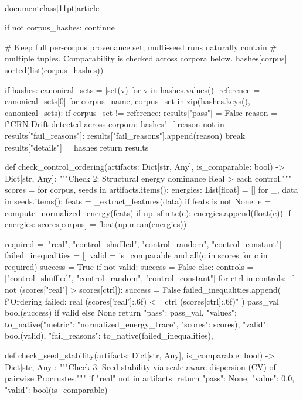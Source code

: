 \\documentclass[11pt]{article}
\begin{document}
\begin{CodeBlock}
        if not corpus_hashes: continue

        # Keep full per-corpus provenance set; multi-seed runs naturally contain
        # multiple tuples. Comparability is checked across corpora below.
        hashes[corpus] = sorted(list(corpus_hashes))
            
    if hashes:
        canonical_sets = [set(v) for v in hashes.values()]
        reference = canonical_sets[0]
        for corpus_name, corpus_set in zip(hashes.keys(), canonical_sets):
            if corpus_set != reference:
                results["pass"] = False
                reason = f"CRN Drift detected across corpora: {hashes}"
                if reason not in results["fail_reasons"]:
                    results["fail_reasons"].append(reason)
                break
    results["details"] = hashes
    return results

def check_control_ordering(artifacts: Dict[str, Any], is_comparable: bool) -> Dict[str, Any]:
    """Check 2: Structural energy dominance Real > each control."""
    scores = {}
    for corpus, seeds in artifacts.items():
        energies: List[float] = []
        for _, data in seeds.items():
            feats = _extract_features(data)
            if feats is not None:
                e = compute_normalized_energy(feats)
                if np.isfinite(e):
                    energies.append(float(e))
        if energies:
            scores[corpus] = float(np.mean(energies))

    required = ["real", "control_shuffled", "control_random", "control_constant"]
    failed_inequalities = []
    valid = is_comparable and all(c in scores for c in required)
    success = True
    if not valid:
        success = False
    else:
        controls = ["control_shuffled", "control_random", "control_constant"]
        for ctrl in controls:
            if not (scores["real"] > scores[ctrl]):
                success = False
                failed_inequalities.append(
                    f"Ordering failed: real ({scores['real']:.6f}) <= {ctrl} ({scores[ctrl]:.6f})"
                )
    pass_val = bool(success) if valid else None
    return {
        "pass": pass_val,
        "values": to_native({"metric": "normalized_energy_trace", "scores": scores}),
        "valid": bool(valid),
        "fail_reasons": to_native(failed_inequalities),
    }

def check_seed_stability(artifacts: Dict[str, Any], is_comparable: bool) -> Dict[str, Any]:
    """Check 3: Seed stability via scale-aware dispersion (CV) of pairwise Procrustes."""
    if "real" not in artifacts:
        return {"pass": None, "value": 0.0, "valid": bool(is_comparable)}


\end{CodeBlock}
\end{document}
